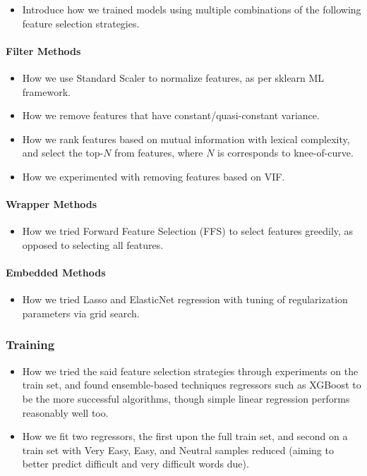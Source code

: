 \documentclass[11pt,a4paper]{article}
\begin{document}
\begin{itemize}
  \item Introduce how we trained models using multiple combinations of the following feature selection strategies.
\end{itemize}

\paragraph{Filter Methods}

\begin{itemize}
  \item How we use Standard Scaler to normalize features, as per sklearn ML framework.
  \item How we remove features that have constant/quasi-constant variance.
  \item How we rank features based on mutual information with lexical complexity, and select the top-$N$ from features, where $N$ is corresponds to knee-of-curve.
  \item How we experimented with removing features based on VIF.
\end{itemize}

\paragraph{Wrapper Methods}

\begin{itemize}
  \item How we tried Forward Feature Selection (FFS) to select features greedily, as opposed to selecting all features.
\end{itemize}

\paragraph{Embedded Methods}

\begin{itemize}
  \item How we tried Lasso and ElasticNet regression with tuning of regularization parameters via grid search.
\end{itemize}

\subsubsection{Training}

\begin{itemize}
  \item How we tried the said feature selection strategies through experiments on the train set, and found ensemble-based techniques regressors such as XGBoost to be the more successful algorithms, though simple linear regression performs reasonably well too.
  \item How we fit two regressors, the first upon the full train set, and second on a train set with Very Easy, Easy, and Neutral samples reduced (aiming to better predict difficult and very difficult words due).
\end{itemize}
\end{document}
